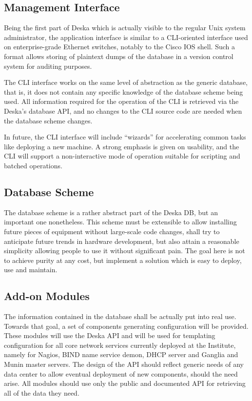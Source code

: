\documentclass[a4paper]{jpconf}
\begin{document}
\subsection{Management Interface}

Being the first part of Deska which is actually visible to the regular Unix system administrator, the application interface is similar
to a CLI-oriented interface used on enterprise-grade Ethernet switches, notably to the Cisco IOS shell.  Such a format allows storing
of plaintext dumps of the database in a version control system for auditing purposes.

The CLI interface works on the same level of abstraction as the generic database, that is, it does not contain any specific knowledge
of the database scheme being used.  All information required for the operation of the CLI is retrieved via the Deska's database API,
and no changes to the CLI source code are needed when the database scheme changes.

In future, the CLI interface will include ``wizards'' for accelerating common tasks like deploying a new machine.  A strong emphasis is
given on usability, and the CLI will support a non-interactive mode of operation suitable for scripting and batched operations.

\subsection{Database Scheme}

The database scheme is a rather abstract part of the Deska DB, but an important one nonetheless.  This scheme must be extensible to
allow installing future pieces of equipment without large-scale code changes, shall try to anticipate future trends in hardware
development, but also attain a reasonable simplicity allowing people to use it without significant pain.  The goal here is not to
achieve purity at any cost, but implement a solution which is easy to deploy, use and maintain.

\subsection{Add-on Modules}

The information contained in the database shall be actually put into real use.  Towards that goal, a set of components generating
configuration will be provided.  These modules will use the Deska API and will be used for templating configuration for all core
network services currently deployed at the Institute, namely for Nagios, BIND name service demon, DHCP server and Ganglia and Munin
master servers.  The design of the API should reflect generic needs of any data center to allow eventual deployment of new components,
should the need arise.  All modules should use only the public and documented API for retrieving all of the data they need.
\end{document}
